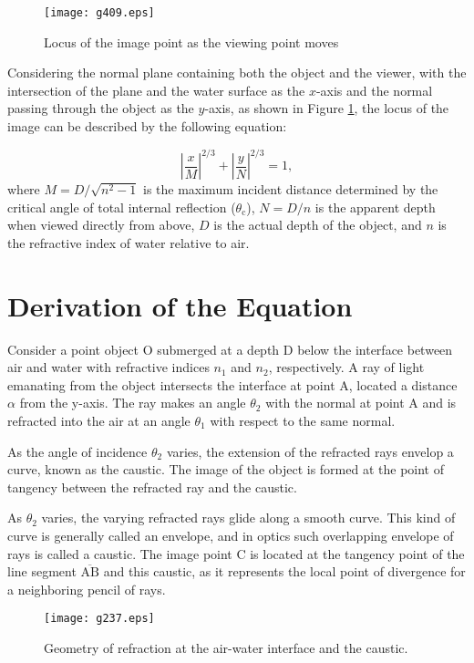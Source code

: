 \documentclass[twocolumn]{article}
\begin{document}
\begin{figure}[h]
	\centering
	\texttt{[image: g409.eps]} \hfill\null
	\caption{Locus of the image point as the viewing point moves}
	\label{fig:caustic}
\end{figure}

Considering the normal plane containing both the object and the viewer, with the intersection of the plane and the water surface as the $x$-axis and the normal passing through the object as the $y$-axis, as shown in Figure \ref{fig:caustic}, the locus of the image can be described by the following equation:

$$ \left| \dfrac{x}{M} \right| ^ {2/3} + \left| \dfrac{y}{N} \right| ^ {2/3} = 1,$$
where $M = D/\sqrt{n^2 - 1}$ is the maximum incident distance determined by the critical angle of total internal reflection ($\theta_{\mathrm{c}}$), $N = D/n$ is the apparent depth when viewed directly from above, $D$ is the actual depth of the object, and $n$ is the refractive index of water relative to air.

\section{Derivation of the Equation}

Consider a point object O submerged at a depth D below the interface between air and water with refractive indices $n_1$ and $n_2$, respectively. A ray of light emanating from the object intersects the interface at point A, located a distance $\alpha$ from the y-axis. The ray makes an angle $\theta_2$ with the normal at point A and is refracted into the air at an angle $\theta_1$ with respect to the same normal.

As the angle of incidence $\theta_2$ varies, the extension of the refracted rays envelop a curve, known as the caustic. The image of the object is formed at the point of tangency between the refracted ray and the caustic.

As $\theta_2$ varies, the varying refracted rays glide along a smooth curve. This kind of curve is generally called an envelope, and in optics such overlapping envelope of rays is called a caustic.
The image point $\mathrm{C}$ is located at the tangency point of the line segment $\overline{\mathrm{AB}}$ and this caustic, as it represents the local point of divergence for a neighboring pencil of rays.

\begin{figure}[h]
	\centering
	\texttt{[image: g237.eps]}
	\caption{Geometry of refraction at the air-water interface and the caustic.}
	\label{fig:geometry}
\end{figure}
\end{document}
